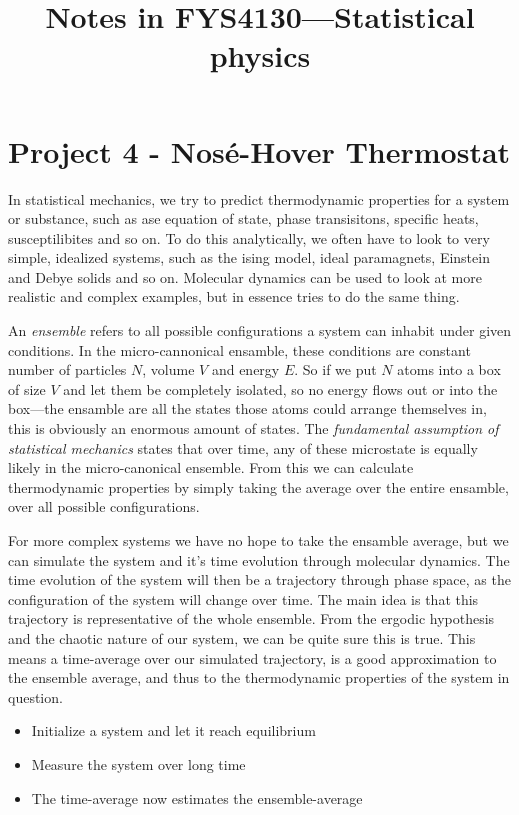 \documentclass[a4paper, 11pt, notitlepage, english]{article}
\author{}
\title{Notes in FYS4130---Statistical physics}
\begin{document}
\section*{Project 4 - Nosé-Hover Thermostat}

In statistical mechanics, we try to predict thermodynamic properties for a system or substance, such as ase equation of state, phase transisitons, specific heats, susceptilibites and so on. To do this analytically, we often have to look to very simple, idealized systems, such as the ising model, ideal paramagnets, Einstein and Debye solids and so on. Molecular dynamics can be used to look at more realistic and complex examples, but in essence tries to do the same thing.

An \emph{ensemble} refers to all possible configurations a system can inhabit under given conditions. In the micro-cannonical ensamble, these conditions are constant number of particles $N$, volume $V$ and energy $E$. So if we put $N$ atoms into a box of size $V$ and let them be completely isolated, so no energy flows out or into the box---the ensamble are all the states those atoms could arrange themselves in, this is obviously an enormous amount of states. The \emph{fundamental assumption of statistical mechanics} states that over time, any of these microstate is equally likely in the micro-canonical ensemble. From this we can calculate thermodynamic properties by simply taking the average over the entire ensamble, over all possible configurations. 

For more complex systems we have no hope to take the ensamble average, but we can simulate the system and it's time evolution through molecular dynamics. The time evolution of the system will then be a trajectory through phase space, as the configuration of the system will change over time. The main idea is that this trajectory is representative of the whole ensemble. From the ergodic hypothesis and the chaotic nature of our system, we can be quite sure this is true. This means a time-average over our simulated trajectory, is a good approximation to the ensemble average, and thus to the thermodynamic properties of the system in question.

\begin{itemize}
	\item Initialize a system and let it reach equilibrium
	\item Measure the system over long time
	\item The time-average now estimates the ensemble-average
\end{itemize}
\end{document}
